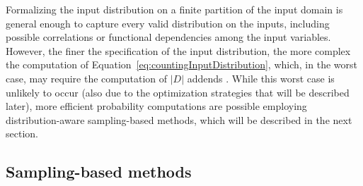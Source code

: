Formalizing the input distribution on a finite partition of the input domain is general enough to capture every valid distribution on the inputs, including possible correlations or functional dependencies among the input variables. However, the finer the specification of the input distribution, the more complex the computation of Equation~\eqref{eq:countingInputDistribution}, which, in the worst case, may require the computation of $|D|$ addends \cite{Borges2014}. While this worst case is unlikely to occur (also due to the optimization strategies that will be described later), more efficient probability computations are possible employing distribution-aware sampling-based methods, which will be described in the next section.

\subsection{Sampling-based methods}\label{sec:computingprobabilitiesSampling}

